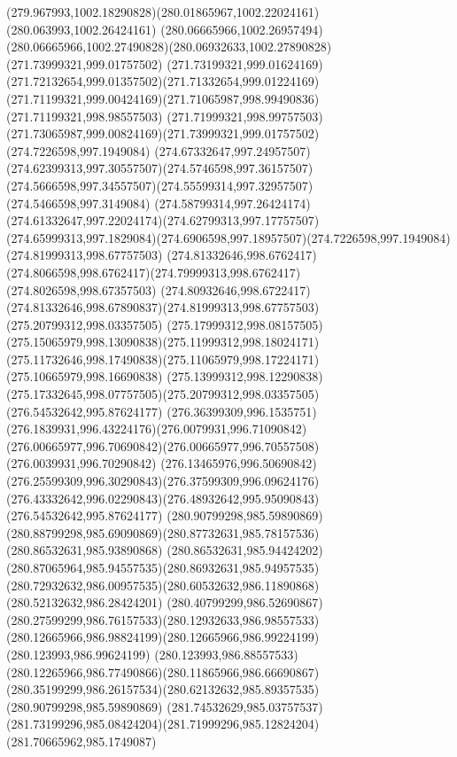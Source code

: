 {{		\curveto(279.967993,1002.18290828)(280.01865967,1002.22024161)(280.063993,1002.26424161)
		\curveto(280.06665966,1002.26957494)(280.06665966,1002.27490828)(280.06932633,1002.27890828)
		\moveto(271.73999321,999.01757502)
		\curveto(271.73199321,999.01624169)(271.72132654,999.01357502)(271.71332654,999.01224169)
		\curveto(271.71199321,999.00424169)(271.71065987,998.99490836)(271.71199321,998.98557503)
		\curveto(271.71999321,998.99757503)(271.73065987,999.00824169)(271.73999321,999.01757502)
		\moveto(274.7226598,997.1949084)
		\curveto(274.67332647,997.24957507)(274.62399313,997.30557507)(274.5746598,997.36157507)
		\curveto(274.5666598,997.34557507)(274.55599314,997.32957507)(274.5466598,997.3149084)
		\curveto(274.58799314,997.26424174)(274.61332647,997.22024174)(274.62799313,997.17757507)
		\curveto(274.65999313,997.1829084)(274.6906598,997.18957507)(274.7226598,997.1949084)
		\moveto(274.81999313,998.67757503)
		\curveto(274.81332646,998.6762417)(274.8066598,998.6762417)(274.79999313,998.6762417)
		\lineto(274.8026598,998.67357503)
		\curveto(274.80932646,998.6722417)(274.81332646,998.67890837)(274.81999313,998.67757503)
		\moveto(275.20799312,998.03357505)
		\curveto(275.17999312,998.08157505)(275.15065979,998.13090838)(275.11999312,998.18024171)
		\curveto(275.11732646,998.17490838)(275.11065979,998.17224171)(275.10665979,998.16690838)
		\curveto(275.13999312,998.12290838)(275.17332645,998.07757505)(275.20799312,998.03357505)
		\moveto(276.54532642,995.87624177)
		\curveto(276.36399309,996.1535751)(276.1839931,996.43224176)(276.0079931,996.71090842)
		\curveto(276.00665977,996.70690842)(276.00665977,996.70557508)(276.0039931,996.70290842)
		\curveto(276.13465976,996.50690842)(276.25599309,996.30290843)(276.37599309,996.09624176)
		\curveto(276.43332642,996.02290843)(276.48932642,995.95090843)(276.54532642,995.87624177)
		\moveto(280.90799298,985.59890869)
		\curveto(280.88799298,985.69090869)(280.87732631,985.78157536)(280.86532631,985.93890868)
		\curveto(280.86532631,985.94424202)(280.87065964,985.94557535)(280.86932631,985.94957535)
		\curveto(280.72932632,986.00957535)(280.60532632,986.11890868)(280.52132632,986.28424201)
		\curveto(280.40799299,986.52690867)(280.27599299,986.76157533)(280.12932633,986.98557533)
		\curveto(280.12665966,986.98824199)(280.12665966,986.99224199)(280.123993,986.99624199)
		\curveto(280.123993,986.88557533)(280.12265966,986.77490866)(280.11865966,986.66690867)
		\curveto(280.35199299,986.26157534)(280.62132632,985.89357535)(280.90799298,985.59890869)
		\moveto(281.74532629,985.03757537)
		\curveto(281.73199296,985.08424204)(281.71999296,985.12824204)(281.70665962,985.1749087)
}}

